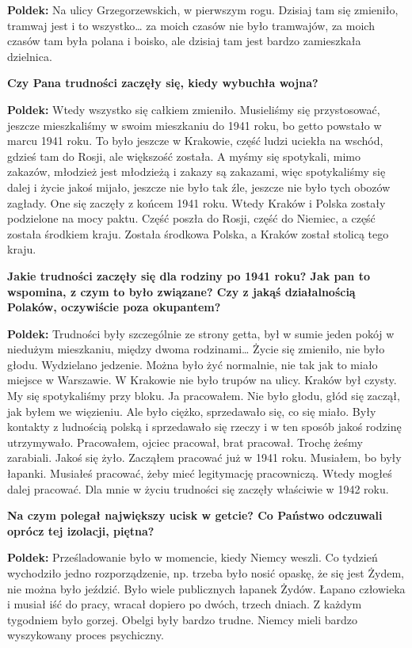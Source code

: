 \textbf{Poldek:} Na ulicy Grzegorzewskich, w pierwszym rogu. Dzisiaj tam się zmieniło, tramwaj jest i to wszystko… za moich czasów nie było tramwajów, za moich czasów tam była polana i boisko, ale dzisiaj tam jest bardzo zamieszkała dzielnica.\par 
\textbf{Czy Pana trudności zaczęły się, kiedy wybuchła wojna?}\par
\textbf{Poldek:} Wtedy wszystko się całkiem zmieniło. Musieliśmy się przystosować, jeszcze mieszkaliśmy w swoim mieszkaniu do 1941 roku, bo getto powstało w marcu 1941 roku. To było jeszcze w Krakowie, część ludzi uciekła na wschód, gdzieś tam do Rosji, ale większość została. A myśmy się spotykali, mimo zakazów, młodzież jest młodzieżą i zakazy są zakazami, więc spotykaliśmy się dalej i życie jakoś mijało, jeszcze nie było tak źle, jeszcze nie było tych obozów zagłady. One się zaczęły z końcem 1941 roku. Wtedy Kraków i Polska zostały podzielone na mocy paktu. Część poszła do Rosji, część do Niemiec, a część została środkiem kraju. Została środkowa Polska, a Kraków został stolicą tego kraju.\par
\textbf{Jakie trudności zaczęły się dla rodziny po 1941 roku? Jak pan to wspomina, z czym to było związane? Czy z jakąś działalnością Polaków, oczywiście poza okupantem?}\par
\textbf{Poldek:} Trudności były szczególnie ze strony getta, był w sumie jeden pokój w niedużym mieszkaniu, między dwoma rodzinami… Życie się zmieniło, nie było głodu. Wydzielano jedzenie. Można było żyć normalnie, nie tak jak to miało miejsce w Warszawie. W Krakowie nie było trupów na ulicy. Kraków był czysty. My się spotykaliśmy przy bloku. Ja pracowałem. Nie było głodu, głód się zaczął, jak byłem we więzieniu. Ale było ciężko, sprzedawało się, co się miało. Były kontakty z ludnością polską i sprzedawało się rzeczy i w ten sposób jakoś rodzinę utrzymywało. Pracowałem, ojciec pracował, brat pracował. Trochę żeśmy zarabiali. Jakoś się żyło. Zacząłem pracować już w 1941 roku. Musiałem, bo były łapanki. Musiałeś pracować, żeby mieć legitymację pracowniczą. Wtedy mogłeś dalej pracować. Dla mnie w życiu trudności się zaczęły właściwie w 1942 roku.\par
\textbf{Na czym polegał największy ucisk w getcie? Co Państwo odczuwali oprócz tej izolacji, piętna?}\par  
\textbf{Poldek:} Prześladowanie było w momencie, kiedy Niemcy weszli. Co tydzień wychodziło jedno rozporządzenie, np. trzeba było nosić opaskę, że się jest Żydem, nie można było jeździć. Było wiele publicznych łapanek Żydów. Łapano człowieka i musiał iść do pracy, wracał dopiero po dwóch, trzech dniach. Z każdym tygodniem było gorzej. Obelgi były bardzo trudne. Niemcy mieli bardzo wyszykowany proces psychiczny.\par
